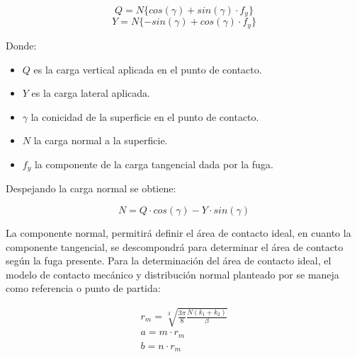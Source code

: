 \documentclass[main]{subfiles}
\begin{document}
\begin{equation}
Q=N\{ cos(\gamma) + sin(\gamma) \cdot f_y \}
\end{equation}
\begin{equation}
Y=N\{ -sin(\gamma) + cos(\gamma) \cdot f_y \}
\end{equation} 
 
\par \hspace{2cm}
\begin{minipage}{8cm}
\begin{spacing}{0.5}
Donde:
\begin{itemize}
\item $Q$ es la carga vertical aplicada en el punto de contacto.
\item $Y$ es la carga lateral aplicada.
\item $\gamma$ la conicidad de la superficie en el punto de contacto.
\item $N$ la carga normal a la superficie.
\item $f_y$ la componente de la carga tangencial dada por la fuga.
\end{itemize}
\end{spacing}
\end{minipage}

Despejando la carga normal se obtiene:

\begin{equation}
N=Q\cdot cos(\gamma) - Y \cdot sin(\gamma) 
\end{equation}


La componente normal, permitirá definir el área de contacto ideal, en cuanto la componente tangencial, se descompondrá para determinar el área de contacto según la fuga presente. Para la determinación del área de contacto ideal, el modelo de contacto mecánico y distribución normal planteado por \citet{Herz1881} se maneja como referencia o punto de partida:

\begin{eqnarray}
r_m=\sqrt[3]{\frac{3\pi}{8}\frac{N(k_1+k_2)}{\beta}}
\\
a=m\cdot r_m
\\
b=n\cdot r_m
\end{eqnarray}
\end{document}
